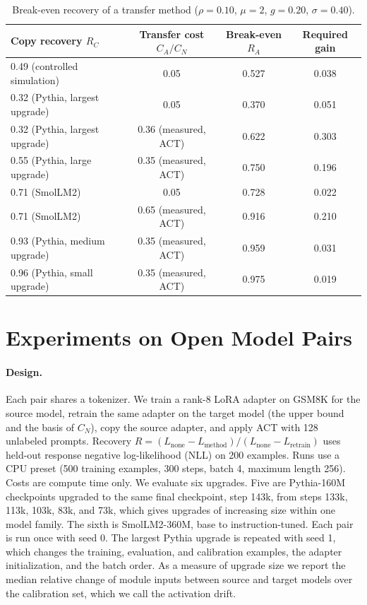 \documentclass[ijoc,nonblindrev]{informs4}
\begin{document}
\begin{table}[t]
\centering
\caption{Break-even recovery of a transfer method ($\rho=0.10$, $\mu=2$, $g=0.20$, $\sigma=0.40$).}\label{tab:breakeven}
\begin{tabular}{lccc}
\toprule
Copy recovery $R_C$ & Transfer cost $C_A/C_N$ & Break-even $R_A$ & Required gain\\
\midrule
0.49 (controlled simulation) & 0.05 & 0.527 & 0.038\\
0.32 (Pythia, largest upgrade) & 0.05 & 0.370 & 0.051\\
0.32 (Pythia, largest upgrade) & 0.36 (measured, ACT) & 0.622 & 0.303\\
0.55 (Pythia, large upgrade) & 0.35 (measured, ACT) & 0.750 & 0.196\\
0.71 (SmolLM2) & 0.05 & 0.728 & 0.022\\
0.71 (SmolLM2) & 0.65 (measured, ACT) & 0.916 & 0.210\\
0.93 (Pythia, medium upgrade) & 0.35 (measured, ACT) & 0.959 & 0.031\\
0.96 (Pythia, small upgrade) & 0.35 (measured, ACT) & 0.975 & 0.019\\
\bottomrule
\end{tabular}
\end{table}

\section{Experiments on Open Model Pairs}\label{sec:pairs}

\paragraph{Design.} Each pair shares a tokenizer. We train a rank-8 LoRA adapter on GSM8K \citep{cobbe2021gsm8k} for the
source model, retrain the same adapter on the target model (the upper bound and the basis of $C_N$), copy the source adapter,
and apply ACT with 128 unlabeled prompts. Recovery $R=(L_{\text{none}}-L_{\text{method}})/(L_{\text{none}}-L_{\text{retrain}})$
uses held-out response negative log-likelihood (NLL) on 200 examples. Runs use a CPU preset (500 training examples, 300 steps,
batch 4, maximum length 256). Costs are compute time only. We evaluate six upgrades. Five are Pythia-160M checkpoints \citep{biderman2023pythia}
upgraded to the same final checkpoint, step 143k, from steps 133k, 113k, 103k, 83k, and 73k, which gives upgrades of increasing size within one model family. The sixth is SmolLM2-360M, base to instruction-tuned.
Each pair is run once with seed 0. The largest Pythia upgrade is repeated with seed 1, which changes the training, evaluation, and calibration examples, the adapter initialization, and the batch order. As a measure of upgrade size we report the median relative change of
module inputs between source and target models over the calibration set, which we call the activation drift.
\end{document}
